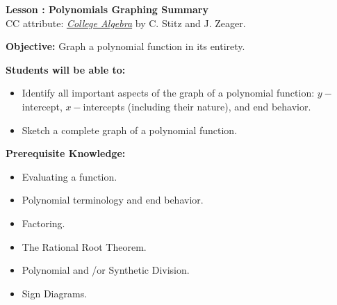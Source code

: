 \documentclass[12pt]{article}
\theoremstyle{definition}
\begin{document}
{\bf \large Lesson : Polynomials Graphing Summary}\label{les:polynomials_graphing_summary}
\\ CC attribute: \href{http://www.stitz-zeager.com}{\it{College Algebra}} by C. Stitz and J. Zeager. 
\hfill \doclicenseImage[imagewidth=5em]\\
\par
{\bf Objective:} Graph a polynomial function in its entirety.\\
\par
{\bf Students will be able to:}
\begin{itemize}
	\item Identify all important aspects of the graph of a polynomial function: $y-$intercept, $x-$intercepts (including their nature), and end behavior.
	\item Sketch a complete graph of a polynomial function.
\end{itemize}
{\bf Prerequisite Knowledge:}
\begin{itemize}
	\item Evaluating a function.
	\item Polynomial terminology and end behavior.
	\item Factoring.
	\item The Rational Root Theorem.
	\item Polynomial and \slash or Synthetic Division.
	\item Sign Diagrams.
\end{itemize}
\hrulefill
\end{document}
